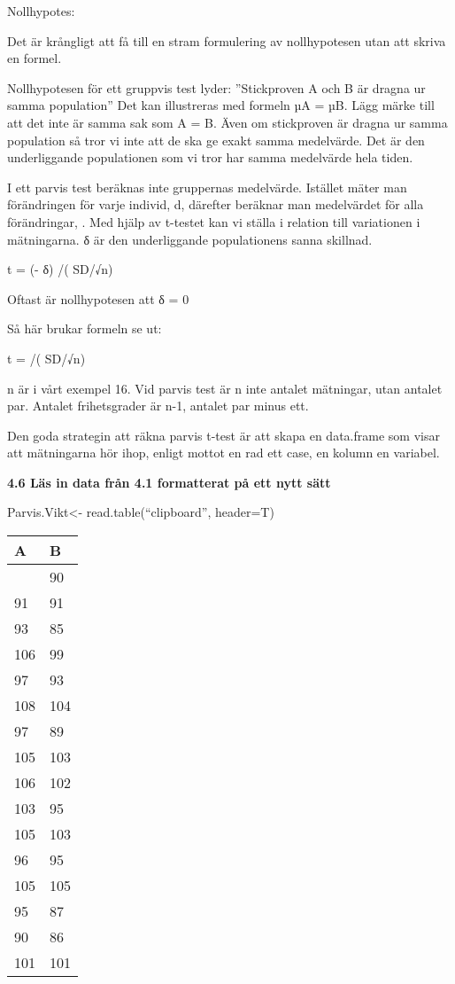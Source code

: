 \documentclass[
  letterpaper,
  DIV=11,
  numbers=noendperiod]{scrartcl}
\begin{document}
Nollhypotes:

Det är krångligt att få till en stram formulering av nollhypotesen utan
att skriva en formel.

Nollhypotesen för ett gruppvis test lyder: ''Stickproven A och B är
dragna ur samma population'' Det kan illustreras med formeln µA = µB.
Lägg märke till att det inte är samma sak som A = B. Även om stickproven
är dragna ur samma population så tror vi inte att de ska ge exakt samma
medelvärde. Det är den underliggande populationen som vi tror har samma
medelvärde hela tiden.

I ett parvis test beräknas inte gruppernas medelvärde. Istället mäter
man förändringen för varje individ, d, därefter beräknar man medelvärdet
för alla förändringar, . Med hjälp av t-testet kan vi ställa i relation
till variationen i mätningarna. δ är den underliggande populationens
sanna skillnad.

t = (- δ) /( SD/√n)

Oftast är nollhypotesen att δ = 0

Så här brukar formeln se ut:

t = /( SD/√n)

n är i vårt exempel 16. Vid parvis test är n inte antalet mätningar,
utan antalet par. Antalet frihetsgrader är n-1, antalet par minus ett.

Den goda strategin att räkna parvis t-test är att skapa en data.frame
som visar att mätningarna hör ihop, enligt mottot en rad ett case, en
kolumn en variabel.

\textbf{4.6 Läs in data från 4.1 formatterat på ett nytt sätt}

Parvis.Vikt\textless- read.table(``clipboard'', header=T)

\begin{longtable}[]{@{}ll@{}}
\toprule\noalign{}
A & B \\
\midrule\noalign{}
\endhead
\bottomrule\noalign{}
\endlastfoot
90 & 90 \\
91 & 91 \\
93 & 85 \\
106 & 99 \\
97 & 93 \\
108 & 104 \\
97 & 89 \\
105 & 103 \\
106 & 102 \\
103 & 95 \\
105 & 103 \\
96 & 95 \\
105 & 105 \\
95 & 87 \\
90 & 86 \\
101 & 101 \\
\end{longtable}
\end{document}
